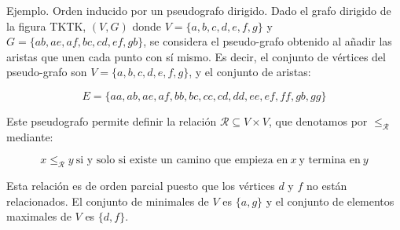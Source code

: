 Ejemplo. Orden inducido por un pseudografo dirigido. Dado el grafo dirigido
de la figura TKTK, $(V, G)$ donde $V = \{a, b, c, d, e, f, g\}$ y $G = \{ab,
ae, af, bc, cd, ef, gb\}$, se considera el pseudo-grafo obtenido al añadir
las aristas que unen cada punto con sí mismo. Es decir, el conjunto de
vértices del pseudo-grafo son $V = \{a, b, c, d, e, f, g\}$, y el conjunto
de aristas:

$$ E = \{aa, ab, ae, af, bb, bc, cc, cd, dd, ee, ef, ff, gb, gg\} $$

Este pseudografo permite definir la relación $\mathcal{R} \subseteq V \times
V$, que denotamos por $\leq_\mathcal{R}$ mediante:

$$ x \leq_\mathcal{R} y \ \text{si y solo si existe un camino que empieza
en} \ x \ \text{y termina en} \ y $$

Esta relación es de orden parcial puesto que los vértices $d$ y $f$ no están
relacionados. El conjunto de minimales de $V$ es $\{a, g\}$ y el conjunto de
elementos maximales de $V$ es $\{d, f\}$.













